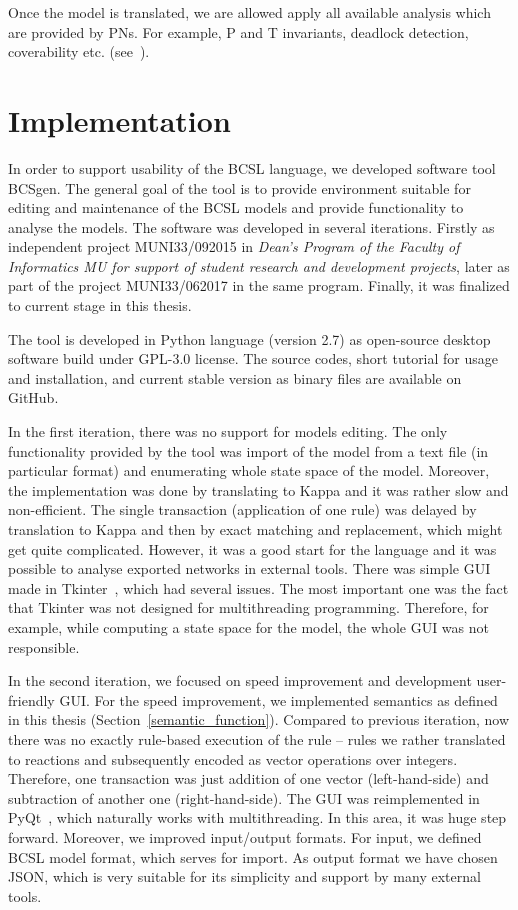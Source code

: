 \documentclass[12pt]{fithesis2}
\begin{document}
Once the model is translated, we are allowed apply all available analysis which are provided by PNs. For example, P and T invariants, deadlock detection, coverability etc. (see~\cite{petri}).

\chapter{Implementation}

In order to support usability of the BCSL language, we developed software tool BCSgen. The general goal of the tool is to provide environment suitable for editing and maintenance of the BCSL models and provide functionality to analyse the models. The software was developed in several iterations. Firstly as independent project MUNI33/092015 in \emph{Dean's Program of the Faculty of Informatics MU for support of student research and development projects}, later as part of the project MUNI33/062017 in the same program. Finally, it was finalized to current stage in this thesis.

The tool is developed in Python language (version 2.7) as open-source desktop software build under GPL-3.0 license. The source codes, short tutorial for usage and installation, and current stable version as binary files are available on GitHub\footnotemark[1].

In the first iteration, there was no support for models editing. The only functionality provided by the tool was import of the model from a text file (in particular format) and enumerating whole state space of the model. Moreover, the implementation was done by translating to Kappa and it was rather slow and non-efficient. The single transaction (application of one rule) was delayed by translation to Kappa and then by exact matching and replacement, which might get quite complicated. However, it was a good start for the language and it was possible to analyse exported networks in external tools. There was simple GUI made in Tkinter~\cite{Tkinter}, which had several issues. The most important one was the fact that Tkinter was not designed for multithreading programming. Therefore, for example, while computing a state space for the model, the whole GUI was not responsible.

In the second iteration, we focused on speed improvement and development user-friendly GUI. For the speed improvement, we implemented semantics as defined in this thesis (Section~\ref{semantic_function}). Compared to previous iteration, now there was no exactly rule-based execution of the rule -- rules we rather translated to reactions and subsequently encoded as vector operations over integers. Therefore, one transaction was just addition of one vector (left-hand-side) and subtraction of another one (right-hand-side). The GUI was reimplemented in PyQt~\cite{summerfield2007rapid}, which naturally works with multithreading. In this area, it was huge step forward. Moreover, we improved input/output formats. For input, we defined BCSL model format, which serves for import. As output format we have chosen JSON, which is very suitable for its simplicity and support by many external tools.
\end{document}
